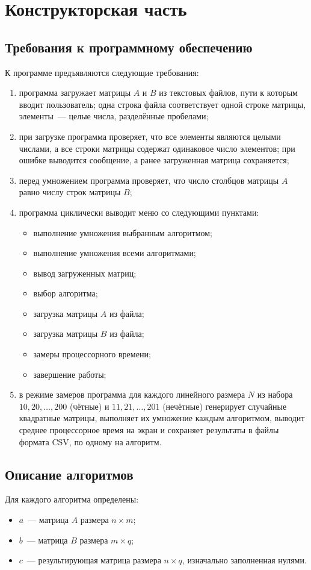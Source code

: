 \section{Конструкторская часть}

\subsection{Требования к программному обеспечению}

К программе предъявляются следующие требования:
\begin{enumerate}
	\item программа загружает матрицы $A$ и $B$ из текстовых файлов, пути к которым вводит пользователь; одна строка файла соответствует одной строке матрицы, элементы~--- целые числа, разделённые пробелами;
	\item при загрузке программа проверяет, что все элементы являются целыми числами, а все строки матрицы содержат одинаковое число элементов; при ошибке выводится сообщение, а ранее загруженная матрица сохраняется;
	\item перед умножением программа проверяет, что число столбцов матрицы $A$ равно числу строк матрицы $B$;
	\item программа циклически выводит меню со следующими пунктами:
	\begin{itemize}
		\item выполнение умножения выбранным алгоритмом;
		\item выполнение умножения всеми алгоритмами;
		\item вывод загруженных матриц;
		\item выбор алгоритма;
		\item загрузка матрицы $A$ из файла;
		\item загрузка матрицы $B$ из файла;
		\item замеры процессорного времени;
		\item завершение работы;
	\end{itemize}
	\item в режиме замеров программа для каждого линейного размера $N$ из набора $10, 20, \ldots, 200$ (чётные) и $11, 21, \ldots, 201$ (нечётные) генерирует случайные квадратные матрицы, выполняет их умножение каждым алгоритмом, выводит среднее процессорное время на экран и сохраняет результаты в файлы формата CSV, по одному на алгоритм.
\end{enumerate}

\subsection{Описание алгоритмов}
Для каждого алгоритма определены:
\begin{itemize}
	\item $a$~--- матрица $A$ размера $n \times m$;
	\item $b$~--- матрица $B$ размера $m \times q$;
	\item $c$~--- результирующая матрица размера $n \times q$, изначально заполненная нулями.
\end{itemize}

